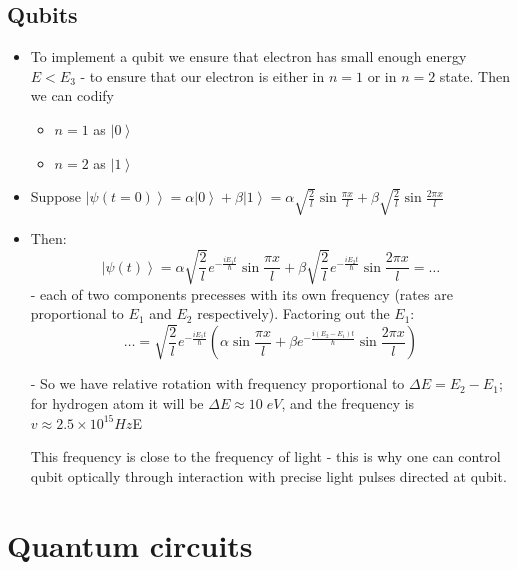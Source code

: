 \documentclass{scrartcl}
\newcommand{\ket}[1]{\left| #1 \right>} %
\begin{document}

\subsection{Qubits}
\label{sec:Qubits}

\begin{itemize}
\item To implement a qubit we ensure that electron has small enough energy $E <
  E_3$ - to ensure that our electron is either in $n=1$ or in $n=2$ state. Then
  we can codify
  \begin{itemize}
  \item $n=1$ as $\ket0$
  \item $n=2$ as $\ket1$
  \end{itemize}
\item Suppose $\ket{\psi(t=0)} = \alpha\ket0 + \beta\ket1 =
  \alpha\sqrt{\frac2{l}} \sin \frac{\pi x}l + \beta \sqrt{\frac2l}\sin
  \frac{2\pi x}l $
\item Then:
$$\ket{\psi(t)} = \alpha \sqrt{\frac2l} e^{-\frac{iE_1t}\hbar} \sin \frac{\pi
  x}l + \beta \sqrt{\frac2l} e^{-\frac{iE_2t}\hbar} \sin \frac{2\pi x}l =
\dots$$ - each of two components precesses with its own frequency (rates are
proportional to $E_1$ and $E_2$ respectively). Factoring out the $E_1$:
$$\dots = \sqrt{\frac2l} e^{-\frac{iE_1t}\hbar} \left( \alpha \sin \frac{\pi x}l
  + \beta e^{-\frac{i(E_2-E_1)t}\hbar} \sin \frac{2 \pi x}l \right)$$

- So we have relative rotation with frequency proportional to $\Delta E =
E_2-E_1$; for hydrogen atom it will be $\Delta E \approx 10 \; eV $, and the
frequency is $v \approx 2.5 \times 10^{15} Hz$E

This frequency is close to the frequency of light - this is why one can control
qubit optically through interaction with precise light pulses directed at qubit.
\end{itemize}

\section{Quantum circuits}
\label{sec:Circuits}
\end{document}
